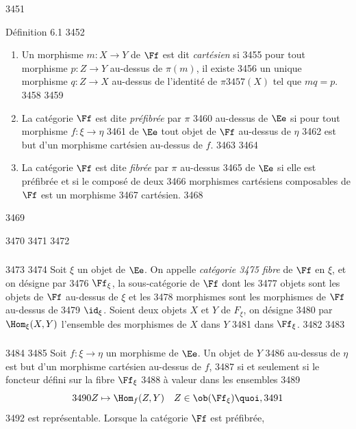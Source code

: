   3451	\begin{enonce*}{Définition 6.1}
  3452	\begin{enumerate}
  3453	\renewcommand{\labelenumi}{\theenumi)}
  3454	\item Un morphisme $m : X \to Y$ de $\Ff$ est dit \emph{cartésien} si
  3455	  pour tout morphisme $p : Z \to Y$ au-dessus de $\pi (m)$, il existe
  3456	  un unique morphisme $q : Z \to X$ au-dessus de l'identité de $\pi
  3457	  (X)$ tel que $m q = p$.
  3458	
  3459	\item La catégorie $\Ff$ est dite \emph{préfibrée} par $\pi$
  3460	  au-dessus de $\Ee$ si pour tout morphisme $f : \xi \to \eta$
  3461	  de $\Ee$  tout objet de $\Ff$ au-dessus de $\eta$
  3462	  est but d'un morphisme cartésien au-dessus de $f$.
  3463	
  3464	\item La catégorie $\Ff$ est dite \emph{fibrée} par $\pi$ au-dessus
  3465	  de $\Ee$ si elle est préfibrée et si le composé de deux
  3466	  morphismes cartésiens composables de $\Ff$ est un morphisme
  3467	  cartésien.
  3468	\end{enumerate}
  3469	\end{enonce*}
  3470	
  3471	\setcounter{subsection}{1}
  3472	\subsubsection{}
  3473	
  3474	Soit $\xi$ un objet de $\Ee$. On appelle \emph{catégorie
  3475	  fibre} de $\Ff$ en $\xi$, et on désigne par
  3476	  $\Ff_{\xi}$, la sous-catégorie de $\Ff$ dont les
  3477	  objets sont les objets de $\Ff$ au-dessus de $\xi$ et les
  3478	  morphismes sont les morphismes de $\Ff$ au-dessus de
  3479	  $\id_{\xi}$. Soient deux objets $X$ et $Y$ de $F_{\xi}$, on désigne
  3480	  par $\Hom_{\xi} (X, Y)$ l'ensemble des morphismes de $X$ dans $Y$
  3481	  dans $\Ff_{\xi}$.
  3482	
  3483	\subsubsection{}
  3484	
  3485	Soit $f : \xi \to \eta$ un morphisme de $\Ee$. Un objet de $Y$
  3486	au-dessus de $\eta$ est but d'un morphisme cartésien au-dessus de $f$,
  3487	si et seulement si le foncteur défini sur la fibre $\Ff_{\xi}$
  3488	à valeur dans les ensembles
  3489	$$
  3490	Z \mapsto \Hom_f(Z, Y)\quad Z \in \ob (\Ff_{\xi}){\quoi},
  3491	$$
  3492	est représentable. Lorsque la catégorie $\Ff$  est préfibrée,
